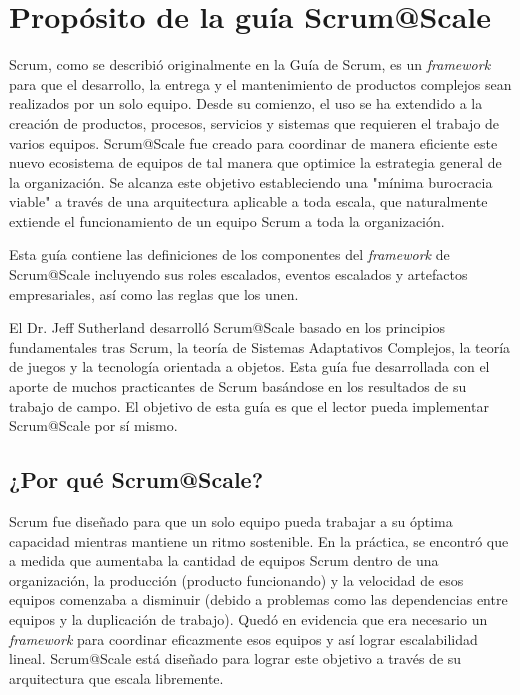 \documentclass{article} %
\begin{document}
\noindent 
\section{Prop\'{o}sito de la gu\'{i}a Scrum@Scale}

\noindent 

\noindent Scrum, como se describi\'{o} originalmente en la Gu\'{i}a de Scrum, es un \textit{framework }para que el desarrollo, la entrega y el mantenimiento de productos complejos sean realizados por un solo equipo. Desde su comienzo, el uso se ha extendido a la creaci\'{o}n de productos, procesos, servicios y sistemas que requieren el trabajo de varios equipos. Scrum@Scale fue creado para coordinar de manera eficiente este nuevo ecosistema de equipos de tal manera que optimice la estrategia general de la organizaci\'{o}n. Se alcanza este objetivo estableciendo una "m\'{i}nima burocracia viable" a trav\'{e}s de una arquitectura aplicable a toda escala, que naturalmente extiende el funcionamiento de un equipo Scrum a toda la organizaci\'{o}n.

\noindent 

\noindent Esta gu\'{i}a contiene las definiciones de los componentes del \textit{framework }de Scrum@Scale incluyendo sus roles escalados, eventos escalados y artefactos empresariales, as\'{i} como las reglas que los unen.

\noindent 

\noindent El Dr. Jeff Sutherland desarroll\'{o} Scrum@Scale basado en los principios fundamentales tras Scrum, la teor\'{i}a de Sistemas Adaptativos Complejos, la teor\'{i}a de juegos y la tecnolog\'{i}a orientada a objetos. Esta gu\'{i}a fue desarrollada con el aporte de muchos practicantes de Scrum bas\'{a}ndose en los resultados de su trabajo de campo. El objetivo de esta gu\'{i}a es que el lector pueda implementar Scrum@Scale por s\'{i} mismo.\textbf{}

\noindent 
\subsection{¿Por qu\'{e} Scrum@Scale?}

\noindent 

\noindent Scrum fue dise\~{n}ado para que un solo equipo pueda trabajar a su \'{o}ptima capacidad mientras mantiene un ritmo sostenible. En la pr\'{a}ctica, se encontr\'{o} que a medida que aumentaba la cantidad de equipos Scrum dentro de una organizaci\'{o}n, la producci\'{o}n (producto funcionando) y la velocidad de esos equipos comenzaba a disminuir (debido a problemas como las dependencias entre equipos y la duplicaci\'{o}n de trabajo). Qued\'{o} en evidencia que era necesario un \textit{framework }para coordinar eficazmente esos equipos y as\'{i} lograr escalabilidad lineal. Scrum@Scale est\'{a} dise\~{n}ado para lograr este objetivo a trav\'{e}s de su arquitectura que escala libremente.
\end{document}
